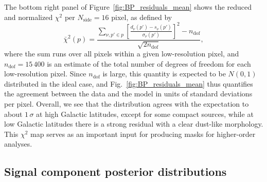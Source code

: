 \documentclass[twocolumn]{aa}
\begin{document}
The bottom right panel of Figure~\ref{fig:BP_residuals_mean} shows the
reduced and normalized $\chi^2$ per $N_{\mathrm{side}}=16$ pixel, as
defined by
\begin{equation}
  \bar{\chi}^2(p) = \frac{\sum_{\nu,p'\in p} \left[\frac{d_{\nu}(p')-s_{\nu}(p')}{\sigma_{\nu}(p')}\right]^2 -n_{\mathrm{dof}}}{\sqrt{2n_{\mathrm{dof}}}},
\end{equation}
where the sum runs over all pixels within a given low-resolution
pixel, and $n_{\mathrm{dof}}=15\,400$ is an estimate of the total
number of degrees of freedom for each low-resolution pixel. Since
$n_{\mathrm{dof}}$ is large, this quantity is expected to be $N(0,1)$
distributed in the ideal case, and Fig.~\ref{fig:BP_residuals_mean} thus
quantifies the agreement between the data and the model in units of
standard deviations per pixel. Overall, we see that the distribution
agrees with the expectation to about $1\,\sigma$ at high Galactic
latitudes, except for some compact sources, while at low Galactic
latitudes there is a strong residual with a clear dust-like
morphology. This $\chi^2$ map serves as an important input for
producing masks for higher-order analyses. 

\subsection{Signal component posterior distributions}
\label{sec:diffuse_comp}
\end{document}
